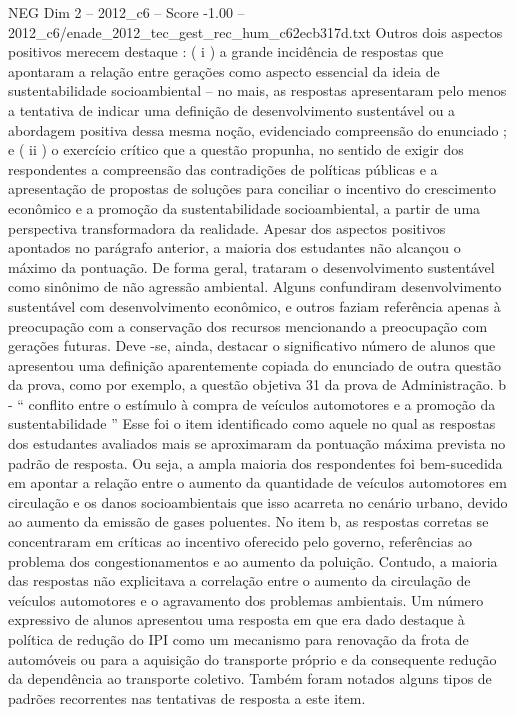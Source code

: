 \begin{textsample}{NEG Dim 2 – 2012\_c6 – Score -1.00 – 2012\_c6/enade\_2012\_tec\_gest\_rec\_hum\_c62ecb317d.txt}
Outros dois aspectos positivos merecem destaque : ( i ) a grande incidência de respostas que apontaram a relação entre gerações como aspecto essencial da ideia de sustentabilidade socioambiental – no mais, as respostas apresentaram pelo menos a tentativa de indicar uma definição de desenvolvimento sustentável ou a abordagem positiva dessa mesma noção, evidenciado compreensão do enunciado ; e ( ii ) o exercício crítico que a questão propunha, no sentido de exigir dos respondentes a compreensão das contradições de políticas públicas e a apresentação de propostas de soluções para conciliar o incentivo do crescimento econômico e a promoção da sustentabilidade socioambiental, a partir de uma perspectiva transformadora da realidade.
Apesar dos aspectos positivos apontados no parágrafo anterior, a maioria dos estudantes não alcançou o máximo da pontuação.
De forma geral, trataram o desenvolvimento sustentável como sinônimo de não agressão ambiental.
Alguns confundiram desenvolvimento sustentável com desenvolvimento econômico, e outros faziam referência apenas à preocupação com a conservação dos recursos mencionando a preocupação com gerações futuras.
Deve -se, ainda, destacar o significativo número de alunos que apresentou uma definição aparentemente copiada do enunciado de outra questão da prova, como por exemplo, a questão objetiva 31 da prova de Administração. b - “ conflito entre o estímulo à compra de veículos automotores e a promoção da sustentabilidade ” Esse foi o item identificado como aquele no qual as respostas dos estudantes avaliados mais se aproximaram da pontuação máxima prevista no padrão de resposta.
Ou seja, a ampla maioria dos respondentes foi bem-sucedida em apontar a relação entre o aumento da quantidade de veículos automotores em circulação e os danos socioambientais que isso acarreta no cenário urbano, devido ao aumento da emissão de gases poluentes.
No item b, as respostas corretas se concentraram em críticas ao incentivo oferecido pelo governo, referências ao problema dos congestionamentos e ao aumento da poluição.
Contudo, a maioria das respostas não explicitava a correlação entre o aumento da circulação de veículos automotores e o agravamento dos problemas ambientais.
Um número expressivo de alunos apresentou uma resposta em que era dado destaque à política de redução do IPI como um mecanismo para renovação da frota de automóveis ou para a aquisição do transporte próprio e da consequente redução da dependência ao transporte coletivo.
Também foram notados alguns tipos de padrões recorrentes nas tentativas de resposta a este item.

\end{textsample}

